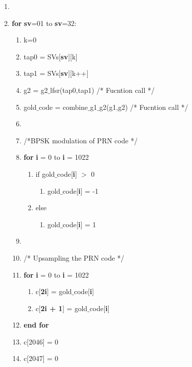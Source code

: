 \documentclass[journal,10pt,onecolumn]{article}
\begin{document}
\begin{enumerate}
    \item[]
    \item[] \textbf{for} \textbf{sv}=01 to \textbf{sv}=32: 
	
	\begin{enumerate}
    \renewcommand{\labelenumii}{\roman{enumii}}
        \item[] k=0
        \item[] tap0 = SVs[\textbf{sv}][k]
        \item[] tap1 = SVs[\textbf{sv}][k++]
        \item[] g2 = g2$\_$lfsr(tap0,tap1)   /* Fucntion call */
        \item[] gold$\_$code = combine$\_$g1$\_$g2(g1,g2)  /* Fucntion call */
        \item[] \item[] /*BPSK modulation of PRN code */
        \item[] \textbf{for} \textbf{i} = 0 to \textbf{i} = 1022
        \begin{enumerate}
            \item[] if gold$\_$code[\textbf{i}] $>$  0 
            \begin{enumerate}
                \item[]  gold$\_$code[\textbf{i}] = -1
            \end{enumerate}
            \item[] else
            \begin{enumerate}
                \item[]  gold$\_$code[\textbf{i}] = 1
            \end{enumerate}
        \end{enumerate} 
    \item[]
    \item[] /* Upsampling the PRN code */
        \item[] \textbf{for} \textbf{i} = 0 to \textbf{i} = 1022
        \begin{enumerate}
            \item[] c[\textbf{2i}] = gold$\_$code[\textbf{i}]
            \item[] c[\textbf{2i + 1}] = gold$\_$code[\textbf{i}]
        \end{enumerate}
        \item[] \textbf{end for}
        \item[] c[2046] = 0
        \item[] c[2047] = 0
    \end{enumerate}
    

\end{enumerate}
\end{document}
